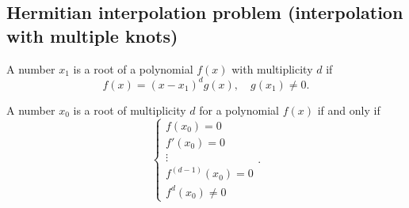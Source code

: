 \subsection*{Hermitian interpolation problem (interpolation with multiple knots)}
\begin{definition}{}{}
    A number $x_1$ is a root of a polynomial $f(x)$  with multiplicity $d$ if
    \[
        f(x) = (x-x_1)^dg(x),\quad g(x_1) \neq 0.
    \]
\end{definition}
\begin{lemma}{}{}
    A number $x_0$ is a root of multiplicity $d$ for a polynomial $f(x)$ if and only if
    \[
            \left\{
                \begin{array}{c}
                    f(x_0) = 0\\
                    f'(x_0) = 0\\
                    \vdots \\
                    f^{(d-1)}(x_0) = 0\\
                    f^d(x_0) \neq 0
                \end{array}
            \right..
    \]
\end{lemma}
